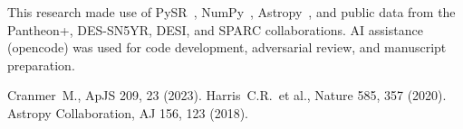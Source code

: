 \documentclass[twocolumn]{aastex631}
\begin{document}
\begin{acknowledgments}
This research made use of PySR~\cite{pysr}, NumPy~\cite{numpy},
Astropy~\cite{astropy}, and public data from the Pantheon+,
DES-SN5YR, DESI, and SPARC collaborations.  AI assistance (opencode)
was used for code development, adversarial review, and manuscript
preparation.
\end{acknowledgments}

\begin{thebibliography}{}
 Cranmer~M., ApJS 209, 23 (2023).
 Harris~C.R.\ et al., Nature 585,
        357 (2020).
 Astropy Collaboration, AJ 156, 123
        (2018).
\end{thebibliography}
\end{document}
